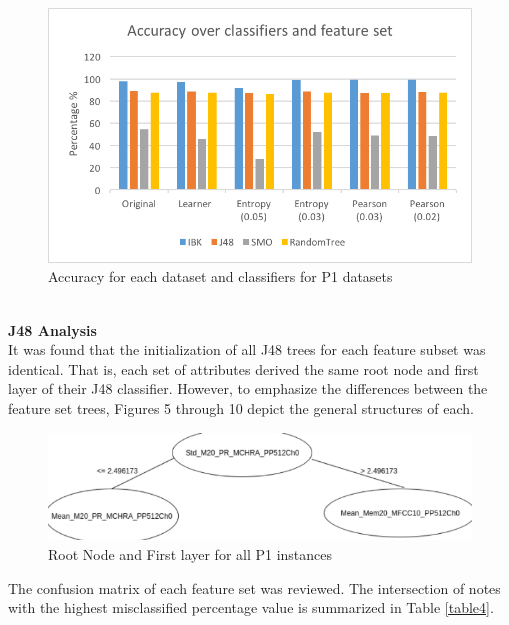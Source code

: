 \documentclass{article}
\begin{document}
\begin{figure}[h]
\includegraphics[scale=.65]{accuracy_p1}
 \caption{Accuracy for each dataset and classifiers for P1 datasets}
\label{figure2}
\end{figure}
\\\textbf{J48 Analysis}\\
It was found that the initialization of all J48 trees for each feature subset was identical. That is, each set of attributes derived the same root node and first layer of their J48 classifier. However, to emphasize the differences between the feature set trees, Figures 5 through 10 depict the general structures of each.
\begin{figure}[h]
\includegraphics[scale=.35]{treenotes}
 \caption{Root Node and First layer for all P1 instances}
\label{figure3}
\end{figure}

The confusion matrix of each feature set was reviewed. The intersection of notes with the highest misclassified percentage value is summarized in Table \ref{table4}.
\end{document}
